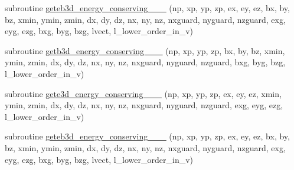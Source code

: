 \begin{DoxyCompactItemize}
\item 
subroutine \hyperlink{field__gathering_8_f90_a97bcf4daf98fbda5e03bdd9288025841}{geteb3d\+\_\+energy\+\_\+conserving\+\_\+\_\+\_} (np, xp, yp, zp, ex, ey, ez, bx, by, bz, xmin, ymin, zmin,                                                                                                                                                           dx, dy, dz, nx, ny, nz, nxguard, nyguard, nzguard,                                                                                                                                                   exg, eyg, ezg, bxg, byg, bzg, lvect, l\+\_\+lower\+\_\+order\+\_\+in\+\_\+v)
\item 
subroutine \hyperlink{field__gathering_8_f90_a14f7dada83129910dde71b2237a3113b}{getb3d\+\_\+energy\+\_\+conserving\+\_\+\_\+\_} (np, xp, yp, zp, bx, by, bz, xmin, ymin, zmin,                                                                                                                                                                           dx, dy, dz, nx, ny, nz, nxguard, nyguard, nzguard,                                                                                                                                                   bxg, byg, bzg, l\+\_\+lower\+\_\+order\+\_\+in\+\_\+v)
\item 
subroutine \hyperlink{field__gathering_8_f90_a31c9a7c694702493d3f93ec9abaab046}{gete3d\+\_\+energy\+\_\+conserving\+\_\+\_\+\_} (np, xp, yp, zp, ex, ey, ez, xmin, ymin, zmin,                                                                                                                                                                           dx, dy, dz, nx, ny, nz, nxguard, nyguard, nzguard,                                                                                                                                                   exg, eyg, ezg, l\+\_\+lower\+\_\+order\+\_\+in\+\_\+v)
\item 
subroutine \hyperlink{field__gathering_8_f90_aa296f91b8369f8c698d2503f0fb6beb4}{geteb3d\+\_\+energy\+\_\+conserving\+\_\+\_\+\_} (np, xp, yp, zp, ex, ey, ez, bx, by, bz,                                                                                                                                                                       xmin, ymin, zmin,                                                                                                                                                                                               dx, dy, dz, nx, ny, nz, nxguard, nyguard, nzguard,                                                                                                                                                                       exg, eyg, ezg, bxg, byg, bzg, lvect, l\+\_\+lower\+\_\+order\+\_\+in\+\_\+v)

\end{DoxyCompactItemize}
